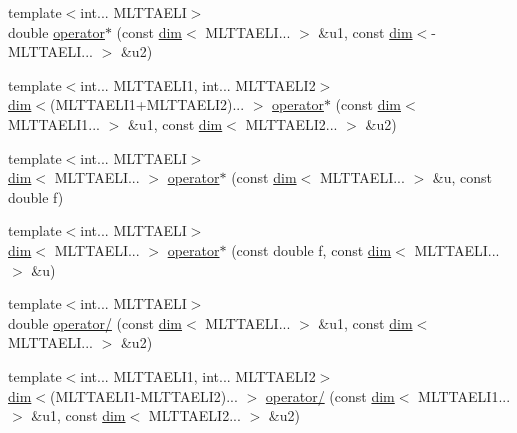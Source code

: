 \begin{DoxyCompactItemize}
\item 
{\footnotesize template$<$int... M\+L\+T\+T\+A\+E\+LI$>$ }\\double \hyperlink{namespacemui_1_1dim_afe1659ab39b97dfe04e07194509491f9}{operator$\ast$} (const \hyperlink{structmui_1_1dim_1_1dim}{dim}$<$ M\+L\+T\+T\+A\+E\+L\+I... $>$ \&u1, const \hyperlink{structmui_1_1dim_1_1dim}{dim}$<$-\/M\+L\+T\+T\+A\+E\+L\+I... $>$ \&u2)
\item 
{\footnotesize template$<$int... M\+L\+T\+T\+A\+E\+L\+I1, int... M\+L\+T\+T\+A\+E\+L\+I2$>$ }\\\hyperlink{structmui_1_1dim_1_1dim}{dim}$<$(M\+L\+T\+T\+A\+E\+L\+I1+M\+L\+T\+T\+A\+E\+L\+I2)... $>$ \hyperlink{namespacemui_1_1dim_af8ca5334a6198409c37afe90e460163f}{operator$\ast$} (const \hyperlink{structmui_1_1dim_1_1dim}{dim}$<$ M\+L\+T\+T\+A\+E\+L\+I1... $>$ \&u1, const \hyperlink{structmui_1_1dim_1_1dim}{dim}$<$ M\+L\+T\+T\+A\+E\+L\+I2... $>$ \&u2)
\item 
{\footnotesize template$<$int... M\+L\+T\+T\+A\+E\+LI$>$ }\\\hyperlink{structmui_1_1dim_1_1dim}{dim}$<$ M\+L\+T\+T\+A\+E\+L\+I... $>$ \hyperlink{namespacemui_1_1dim_a907ada47c6d390dc77c6b3b23f94aae9}{operator$\ast$} (const \hyperlink{structmui_1_1dim_1_1dim}{dim}$<$ M\+L\+T\+T\+A\+E\+L\+I... $>$ \&u, const double f)
\item 
{\footnotesize template$<$int... M\+L\+T\+T\+A\+E\+LI$>$ }\\\hyperlink{structmui_1_1dim_1_1dim}{dim}$<$ M\+L\+T\+T\+A\+E\+L\+I... $>$ \hyperlink{namespacemui_1_1dim_a98f23ba6e8e53e2d0997d7c01bd81d17}{operator$\ast$} (const double f, const \hyperlink{structmui_1_1dim_1_1dim}{dim}$<$ M\+L\+T\+T\+A\+E\+L\+I... $>$ \&u)
\item 
{\footnotesize template$<$int... M\+L\+T\+T\+A\+E\+LI$>$ }\\double \hyperlink{namespacemui_1_1dim_a4c26075444e27914b56a4decef520e36}{operator/} (const \hyperlink{structmui_1_1dim_1_1dim}{dim}$<$ M\+L\+T\+T\+A\+E\+L\+I... $>$ \&u1, const \hyperlink{structmui_1_1dim_1_1dim}{dim}$<$ M\+L\+T\+T\+A\+E\+L\+I... $>$ \&u2)
\item 
{\footnotesize template$<$int... M\+L\+T\+T\+A\+E\+L\+I1, int... M\+L\+T\+T\+A\+E\+L\+I2$>$ }\\\hyperlink{structmui_1_1dim_1_1dim}{dim}$<$(M\+L\+T\+T\+A\+E\+L\+I1-\/M\+L\+T\+T\+A\+E\+L\+I2)... $>$ \hyperlink{namespacemui_1_1dim_afb08a9623e695fe5e68738decb7c5ea9}{operator/} (const \hyperlink{structmui_1_1dim_1_1dim}{dim}$<$ M\+L\+T\+T\+A\+E\+L\+I1... $>$ \&u1, const \hyperlink{structmui_1_1dim_1_1dim}{dim}$<$ M\+L\+T\+T\+A\+E\+L\+I2... $>$ \&u2)

\end{DoxyCompactItemize}
